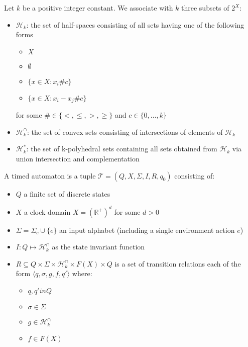 \documentclass[table]{beamer}
\begin{document}
\begin{frame}
	\begin{dfn}
		Let $k$ be a positive integer constant. We associate with $k$ three subsets of $2^X$:
		\begin{itemize}
			\item $\mathcal{H}_k$: the set of half-spaces consisting of all sets having one of the following forms
				\begin{itemize}
					\item $X$
					\item $\emptyset$
					\item $\{x \in X:x_i \# c\}$
					\item $\{x \in X:x_i-x_j \# c\}$
				\end{itemize}
				for some $\# \in \{<,\leq,>,\geq\}$ and $c \in \{0,\ldots,k\}$
			\item $\mathcal{H}^\cap_k$: the set of convex sets consisting of intersections of elements of $\mathcal{H}_k$
			\item $\mathcal{H}^*_k$: the set of k-polyhedral sets containing all sets obtained from $\mathcal{H}_k$ via union intersection and complementation
		\end{itemize}
	\end{dfn}
\end{frame}

\begin{frame}
	\begin{dfn}
		A timed automaton is a tuple $\mathcal{T}=\left( Q,X,\Sigma,I,R,q_0\right)$ consisting of:
		\begin{itemize}
			\item $Q$ a finite set of discrete states
			\item $X$ a clock domain $X=(\mathbb{R}^+)^d$ for some $d>0$
			\item $\Sigma=\Sigma_c \cup \{e\}$ an input alphabet (including a single environment action $e$)
			\item $I:Q \mapsto \mathcal{H}^\cap_k$ as the state invariant function
			\item $R \subseteq Q \times \Sigma \times \mathcal{H}^\cap_k \times F(X) \times Q$ is
			 a set of transition relations each of the form $\langle q,\sigma,g,f,q'\rangle$ where:
			\begin{itemize}
				\item $q,q' in Q$
				\item $\sigma \in \Sigma$
				\item $g \in \mathcal{H}^\cap_k$
				\item $f \in F(X)$
			\end{itemize}
		\end{itemize}
	\end{dfn}
\end{frame}
\end{document}
